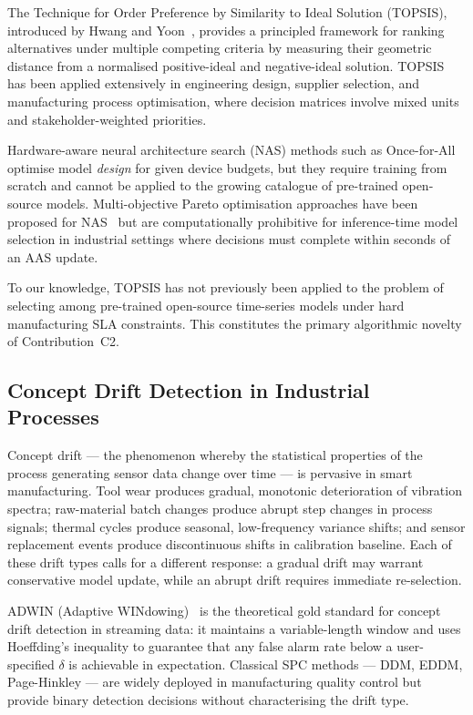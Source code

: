 \documentclass[12pt,a4paper]{article}
\begin{document}
The Technique for Order Preference by Similarity to Ideal Solution
(TOPSIS), introduced by Hwang and Yoon~\cite{Hwang1981TOPSIS},
provides a principled framework for ranking alternatives under
multiple competing criteria by measuring their geometric distance
from a normalised positive-ideal and negative-ideal solution.
TOPSIS has been applied extensively in engineering design, supplier
selection, and manufacturing process optimisation, where decision
matrices involve mixed units and stakeholder-weighted priorities.

Hardware-aware neural architecture search (NAS) methods such as
Once-for-All optimise model \emph{design} for given device budgets,
but they require training from scratch and cannot be applied to the
growing catalogue of pre-trained open-source models.
Multi-objective Pareto optimisation approaches have been proposed for
NAS~\cite{Shi2016EdgeComputing} but are computationally prohibitive
for inference-time model selection in industrial settings where
decisions must complete within seconds of an AAS update.

To our knowledge, TOPSIS has not previously been applied to the
problem of selecting among pre-trained open-source time-series
models under hard manufacturing SLA constraints. This constitutes
the primary algorithmic novelty of Contribution~C2.

\subsection{Concept Drift Detection in Industrial Processes}
\label{subsec:rel-drift}

Concept drift --- the phenomenon whereby the statistical properties
of the process generating sensor data change over time --- is
pervasive in smart manufacturing.
Tool wear produces gradual, monotonic deterioration of vibration
spectra; raw-material batch changes produce abrupt step changes
in process signals; thermal cycles produce seasonal, low-frequency
variance shifts; and sensor replacement events produce
discontinuous shifts in calibration baseline.
Each of these drift types calls for a different response: a gradual
drift may warrant conservative model update, while an abrupt drift
requires immediate re-selection.

ADWIN (Adaptive WINdowing)~\cite{Bifet2007ADWIN} is the theoretical
gold standard for concept drift detection in streaming data: it
maintains a variable-length window and uses Hoeffding's inequality to
guarantee that any false alarm rate below a user-specified $\delta$ is
achievable in expectation.
Classical SPC methods --- DDM, EDDM, Page-Hinkley --- are widely
deployed in manufacturing quality control but provide binary
detection decisions without characterising the drift type.
\end{document}
